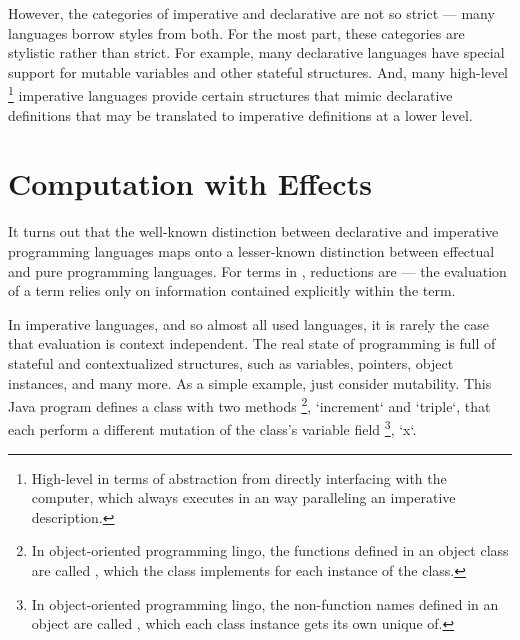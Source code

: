 However, the categories of imperative and declarative are not so strict --- many languages borrow styles from both.
For the most part, these categories are stylistic rather than strict.
For example, many declarative languages have special support for mutable variables and other stateful structures.
And, many high-level%
\footnote{High-level in terms of abstraction from directly interfacing with the computer, which always executes in an way paralleling an imperative description.}
imperative languages provide certain structures that mimic declarative definitions that may be translated to imperative definitions at a lower level.



\section{Computation with Effects}
\label{sec:computation-with-effects}

It turns out that the well-known distinction between declarative and imperative programming languages maps onto a lesser-known distinction between effectual and pure programming languages.
For terms in \LangA, reductions are  --- the evaluation of a term relies only on information contained explicitly within the term.

In imperative languages, and so almost all used languages, it is rarely the case that evaluation is context independent.
The real state of programming is full of stateful and contextualized structures, such as variables, pointers, object instances, and many more.
As a simple example, just consider mutability.
This Java program defines a class with two methods%
\footnote{
  In object-oriented programming lingo, the functions defined in an object class are called , which the class implements for each instance of the class.},
\code`increment` and \code`triple`,
that each perform a different mutation of the class's variable field%
\footnote{
  In object-oriented programming lingo, the non-function names defined in an object are called , which each class instance gets its own unique of.},
\code`x`.

